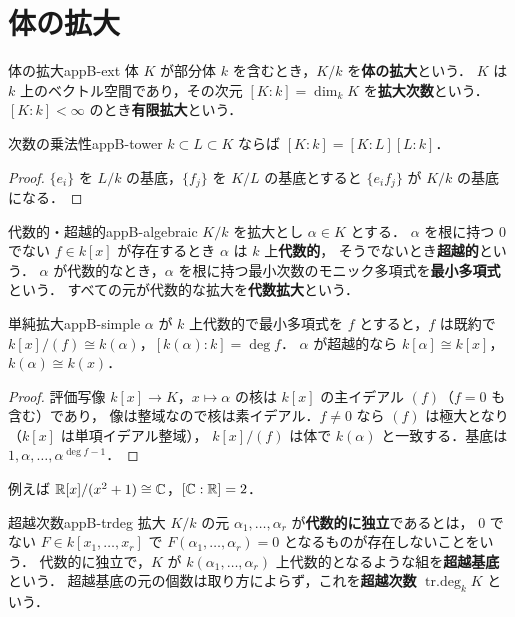 \section{体の拡大}

\begin{mydef}{体の拡大}{appB-ext}
体 $K$ が部分体 $k$ を含むとき，$K/k$ を\textbf{体の拡大}という．
$K$ は $k$ 上のベクトル空間であり，その次元 $[K:k]=\dim_kK$ を\textbf{拡大次数}という．
$[K:k]<\infty$ のとき\textbf{有限拡大}という．
\end{mydef}

\begin{myprop}{次数の乗法性}{appB-tower}
$k\subset L\subset K$ ならば $[K:k]=[K:L][L:k]$．
\end{myprop}
\begin{proof}
$\{e_i\}$ を $L/k$ の基底，$\{f_j\}$ を $K/L$ の基底とすると $\{e_if_j\}$ が $K/k$ の基底になる．
\end{proof}

\begin{mydef}{代数的・超越的}{appB-algebraic}
$K/k$ を拡大とし $\alpha\in K$ とする．
$\alpha$ を根に持つ $0$ でない $f\in k[x]$ が存在するとき $\alpha$ は $k$ 上\textbf{代数的}，
そうでないとき\textbf{超越的}という．
$\alpha$ が代数的なとき，$\alpha$ を根に持つ最小次数のモニック多項式を\textbf{最小多項式}という．
すべての元が代数的な拡大を\textbf{代数拡大}という．
\end{mydef}

\begin{myprop}{単純拡大}{appB-simple}
$\alpha$ が $k$ 上代数的で最小多項式を $f$ とすると，$f$ は既約で
$k[x]/(f)\cong k(\alpha)$，$[k(\alpha):k]=\deg f$．
$\alpha$ が超越的なら $k[\alpha]\cong k[x]$，$k(\alpha)\cong k(x)$．
\end{myprop}
\begin{proof}
評価写像 $k[x]\to K$，$x\mapsto\alpha$ の核は $k[x]$ の主イデアル $(f)$（$f=0$ も含む）であり，
像は整域なので核は素イデアル．$f\ne0$ なら $(f)$ は極大となり（$k[x]$ は単項イデアル整域），
$k[x]/(f)$ は体で $k(\alpha)$ と一致する．基底は $1,\alpha,\dots,\alpha^{\deg f-1}$．
\end{proof}

例えば $\mathbb{R}[x]/(x^2+1)\cong\mathbb{C}$，$[\mathbb{C}:\mathbb{R}]=2$．

\begin{mydef}{超越次数}{appB-trdeg}
拡大 $K/k$ の元 $\alpha_1,\dots,\alpha_r$ が\textbf{代数的に独立}であるとは，
$0$ でない $F\in k[x_1,\dots,x_r]$ で $F(\alpha_1,\dots,\alpha_r)=0$ となるものが存在しないことをいう．
代数的に独立で，$K$ が $k(\alpha_1,\dots,\alpha_r)$ 上代数的となるような組を\textbf{超越基底}という．
超越基底の元の個数は取り方によらず，これを\textbf{超越次数} $\mathop{\mathrm{tr.deg}}\nolimits_kK$ という．
\end{mydef}


